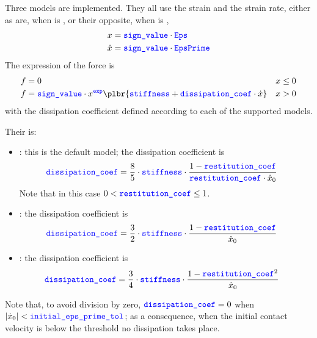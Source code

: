 Three models are implemented. They all use the strain and the strain rate, either as are, when  is ,
or their opposite, when  is ,
\begin{subequations}
\begin{align}
	x &= \textcolor{blue}{\texttt{sign\_value}} \cdot \textcolor{blue}{\texttt{Eps}}
	\\
	\dot{x} &= \textcolor{blue}{\texttt{sign\_value}} \cdot \textcolor{blue}{\texttt{EpsPrime}}
\end{align}
\end{subequations}
The expression of the force is
\begin{subequations}
\begin{align}
	f &= 0 && \text{$x \le 0$}
	\\
	f &= \nt{sign\_value} \cdot  x^{\nt{exp}} \plbr{ \nt{stiffness} + \nt{dissipation\_coef} \cdot \dot{x}} && \text{$x > 0$}
\end{align}
\end{subequations}
with the dissipation coefficient  defined according to each of the supported models.

Their  is:
\begin{itemize}
\item {} \cite{FLORES-2011-MUBO}: this is the default model; the dissipation coefficient is
\begin{align}
	\textcolor{blue}{\texttt{dissipation\_coef}} &= \frac{8}{5} \cdot \textcolor{blue}{\texttt{stiffness}} \cdot \frac{1 - \textcolor{blue}{\texttt{restitution\_coef}}}{\textcolor{blue}{\texttt{restitution\_coef}} \cdot \dot{x}_0}
\end{align}
Note that in this case $0 < \textcolor{blue}{\texttt{restitution\_coef}} \le 1$.

\item {} \cite{HUNT-1975}: the dissipation coefficient is
\begin{align}
	\textcolor{blue}{\texttt{dissipation\_coef}} &= \frac{3}{2} \cdot \textcolor{blue}{\texttt{stiffness}} \cdot \frac{1 - \textcolor{blue}{\texttt{restitution\_coef}}}{\dot{x}_0}
\end{align}

\item {} \cite{LANKARANI-1994-ND}: the dissipation coefficient is
\begin{align}
	\textcolor{blue}{\texttt{dissipation\_coef}} &= \frac{3}{4} \cdot \textcolor{blue}{\texttt{stiffness}} \cdot \frac{1 - \textcolor{blue}{\texttt{restitution\_coef}}^2}{\dot{x}_0}
\end{align}
\end{itemize}
Note that, to avoid division by zero, $\textcolor{blue}{\texttt{dissipation\_coef}} = 0$ when $|\dot{x}_0| < \textcolor{blue}{\texttt{initial\_eps\_prime\_tol}}$;
as a consequence, when the initial contact velocity is below the threshold no dissipation takes place.

